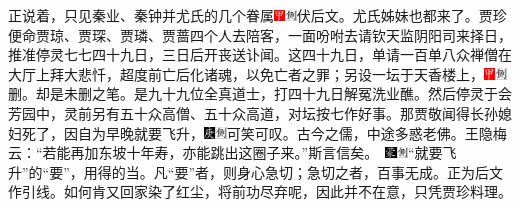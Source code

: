 正说着，只见秦业、秦钟并尤氏的几个眷属{\includegraphics[width=3mm]{../Images/00002}\includegraphics[width=3mm]{../Images/00011}\footnotesize \kaishu 伏后文。}尤氏姊妹也都来了。贾珍便命贾琼、贾琛、贾璘、贾蔷四个人去陪客，一面吩咐去请钦天监阴阳司来择日，推准停灵七七四十九日，三日后开丧送讣闻。这四十九日，单请一百单八众禅僧在大厅上拜大悲忏，超度前亡后化诸魂，以免亡者之罪；另设一坛于天香楼上，{\includegraphics[width=3mm]{../Images/00002}\includegraphics[width=3mm]{../Images/00011}\footnotesize \kaishu 删。却是未删之笔。}是九十九位全真道士，打四十九日解冤洗业醮。然后停灵于会芳园中，灵前另有五十众高僧、五十众高道，对坛按七作好事。那贾敬闻得长孙媳妇死了，因自为早晚就要飞升，{{\includegraphics[width=3mm]{../Images/00004}\includegraphics[width=3mm]{../Images/00011}\footnotesize \kaishu 可笑可叹。古今之儒，中途多惑老佛。王隐梅云：“若能再加东坡十年寿，亦能跳出这圈子来。”斯言信矣。　}\includegraphics[width=3mm]{../Images/00006}\includegraphics[width=3mm]{../Images/00011}\footnotesize \kaishu “就要飞升”的“要”，用得的当。凡“要”者，则身心急切；急切之者，百事无成。正为后文作引线。}如何肯又回家染了红尘，将前功尽弃呢，因此并不在意，只凭贾珍料理。

